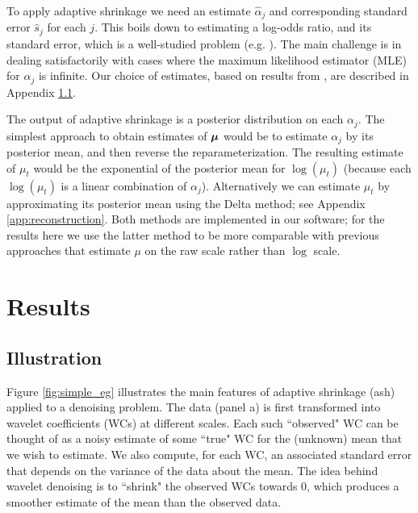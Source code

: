 \documentclass[12pt]{article}
\begin{document}
To apply adaptive shrinkage we need an estimate $\hat{\alpha}_{j}$ and corresponding standard error $\hat{s}_j$
for each $j$. This boils down to estimating a log-odds ratio, and its standard error, which is a well-studied problem
(e.g. \cite{Gart1967Bias}). The main challenge is in dealing satisfactorily with cases where the maximum likelihood estimator (MLE) for $\alpha_j$ is infinite. Our choice of estimates, based on results from \cite{Gart1967Bias}, are described in Appendix \ref{}.

The output of adaptive shrinkage is a posterior distribution on each $\alpha_j$. The simplest approach
to obtain estimates of $\bm{\mu}$  would be to estimate
$\alpha_j$ by its posterior mean, and then reverse the reparameterization. 
The resulting estimate of $\mu_t$ would be the exponential of the posterior
mean for $\log(\mu_t)$ (because each $\log(\mu_t)$ is a linear combination of $\alpha_j$).
Alternatively we can estimate $\mu_t$ by approximating its posterior mean using the Delta method; see Appendix \ref{app:reconstruction}.
Both methods are implemented in our software; for the results here we use the latter method 
to be more comparable with previous approaches that estimate $\mu$ on the raw scale rather than $\log$ scale.


 




\section{Results}

\subsection{Illustration}

Figure \ref{fig:simple_eg} illustrates the main features of adaptive shrinkage (ash) applied 
to a denoising problem. The data (panel a) is first transformed into wavelet coefficients (WCs) at different scales.
Each such ``observed" WC can be thought of as a noisy estimate of some ``true" WC for the (unknown) mean that we wish to estimate.
We also compute, for each WC, an associated standard error that depends on the variance of the data about the mean.
The idea behind wavelet denoising is to ``shrink" the observed WCs towards 0, which produces a smoother estimate of the mean than the observed data.
\end{document}
